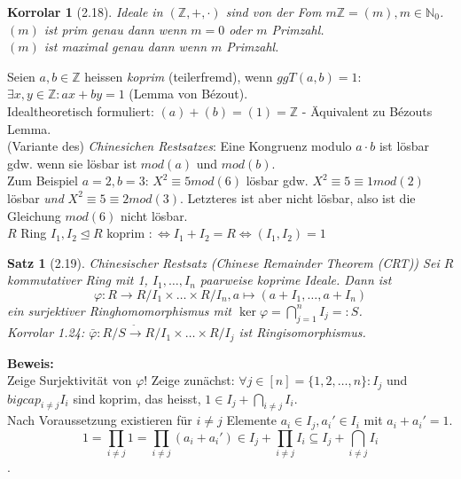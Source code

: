 \documentclass[10pt,a4paper]{article}
\newtheorem{satz}{Satz}
\newtheorem{korr}{Korrolar}
\begin{document}
\begin{korr}[2.18]
 Ideale in $(\mathbb{Z},+,\cdot)$ sind von der Fom $m\mathbb{Z} = (m), m \in \mathbb{N}_0$.\\
 $(m)$ ist \emph{prim} genau dann wenn $m = 0$ oder $m$ Primzahl.\\
 $(m)$ ist \emph{maximal} genau dann wenn $m$ Primzahl.\\
\end{korr}
Seien $a,b \in \mathbb{Z}$ heissen \emph{koprim} (teilerfremd), wenn $ggT(a,b) = 1$: $\exists x,y \in \mathbb{Z}: ax + by = 1$ (Lemma von Bézout).\\
Idealtheoretisch formuliert: $(a) + (b) = (1) = \mathbb{Z}$ - Äquivalent zu Bézouts Lemma.\\
(Variante des) \emph{Chinesichen Restsatzes}: Eine Kongruenz modulo $a \cdot b$ ist lösbar gdw. wenn sie lösbar ist $mod (a)$ und $mod (b)$.\\
Zum Beispiel $a = 2, b = 3$: $X^2 \equiv 5 mod (6)$ lösbar gdw. $X^2 \equiv 5 \equiv 1 mod (2)$ lösbar \emph{und} $X^2 \equiv 5 \equiv 2 mod (3)$. Letzteres ist aber nicht lösbar, also ist die Gleichung $mod (6)$ nicht lösbar.\\
$R$ Ring $I_1, I_2 \trianglelefteq R$ koprim $:\Leftrightarrow I_1 + I_2 = R \Leftrightarrow (I_1,I_2) = 1$
\begin{satz}[2.19]{Chinesischer Restsatz (Chinese Remainder Theorem (CRT))}
Sei $R$ kommutativer Ring mit 1, $I_1, \dots, I_n$ paarweise koprime Ideale. Dann ist
$$\varphi : R \rightarrow R/I_1 \times \dots \times R/I_n, a \mapsto (a + I_1, \dots, a + I_n)$$
ein surjektiver Ringhomomorphismus mit $\ker \varphi = \bigcap_{j=1}^n I_j =: S$.\\
Korrolar 1.24: $\bar \varphi : R/S \overset{\tilde{ }}{\rightarrow} R/I_1 \times \dots \times R/I_j$ ist Ringisomorphismus.
\end{satz}
\textbf{Beweis:}\\
Zeige Surjektivität von $\varphi$! Zeige zunächst: $\forall j \in [n] = \lbrace 1, 2,  \dots, n\rbrace: I_j$ und $bigcap_{i \neq j} I_i$ sind koprim, das heisst, $1 \in I_j + \bigcap_{i \neq j} I_i$.\\
Nach Voraussetzung existieren für $i \neq j$ Elemente $a_i \in I_j, a_i' \in I_i$ mit $a_i + a_i' = 1$.\\
$$1 = \prod_{i \neq j} 1 = \prod_{i \neq j} (a_i + a_i') \in I_j + \prod_{i \neq j} I_i \subseteq I_j + \bigcap_{i \neq j} I_i$$.



\end{document}
